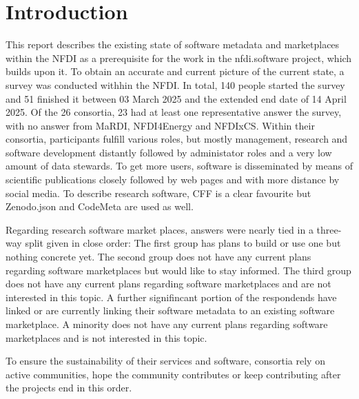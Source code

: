 \documentclass[headsepline,titlepage,twoside,12pt,toc=flat,headings=normal]{scrreprt}
\author{\theauthor}
\date{\thedate}
\title{\thetitle}
\subtitle{Deliverable 2.2}
\begin{document}
\maketitle
\imprint

\chapter*{Introduction}\label{ch:introduction}

This report describes the existing state of software metadata and marketplaces within the NFDI as a prerequisite for the work in the nfdi.software project, which builds upon it.
To obtain an accurate and current picture of the current state, a survey was conducted withhin the NFDI.
In total, 140 people started the survey and 51 finished it between 03 March 2025 and the extended end date of 14 April 2025.
Of the 26 consortia, 23 had at least one representative answer the survey, with no answer from MaRDI, NFDI4Energy and NFDIxCS.
Within their consortia, participants fulfill various roles, but mostly management, research and software development distantly followed by administator roles and a very low amount of data stewards.
To get more users, software is disseminated by means of scientific publications closely followed by web pages and with more distance by social media.
To describe research software, \ac{CFF} is a clear favourite but Zenodo.json and CodeMeta are used as well.

Regarding research software market places, answers were nearly tied in a three-way split given in close order:
The first group has plans to build or use one but nothing concrete yet.
The second group does not have any current plans regarding software marketplaces but would like to stay informed.
The third group does not have any current plans regarding software marketplaces and are not interested in this topic.
A further signifincant portion of the respondends have linked or are currently linking their software metadata to an existing software marketplace.
A minority does not have any current plans regarding software marketplaces and is not interested in this topic.

To ensure the sustainability of their services and software, consortia rely on active communities, hope the community contributes or keep contributing after the projects end in this order.
\end{document}
